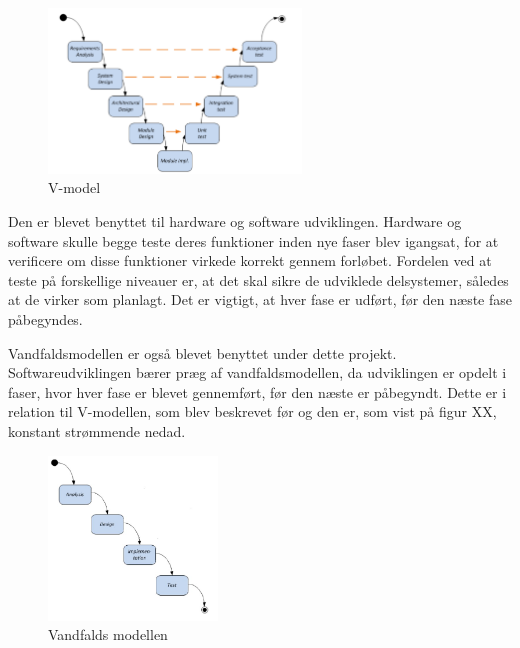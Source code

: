 \begin{figure}[H]
	\centering
	\includegraphics[width=0.6\textwidth]{Figurer/VModellen}
	\caption{V-model}
	\label{fig:V_Modellen}
\end{figure}

Den er blevet benyttet til hardware og software udviklingen. Hardware og software skulle begge teste deres funktioner inden nye faser blev igangsat, for at verificere om disse funktioner virkede korrekt gennem forløbet. Fordelen ved at teste på forskellige niveauer er, at det skal sikre de udviklede delsystemer, således at de virker som planlagt. Det er vigtigt, at hver fase er udført, før den næste fase påbegyndes. 
\newline

Vandfaldsmodellen \cite{ISE} er også blevet benyttet under dette projekt. Softwareudviklingen bærer præg af vandfaldsmodellen, da udviklingen er opdelt i faser, hvor hver fase er blevet gennemført, før den næste er påbegyndt. Dette er i relation til V-modellen, som blev beskrevet før og den er, som vist på figur XX, konstant strømmende nedad. 

\begin{figure}[H]
	\centering
	\includegraphics[width=0.4\textwidth]{Figurer/VandfaldsModellen}
	\caption{Vandfalds modellen}
	\label{fig:vandfalds_model}
\end{figure}



